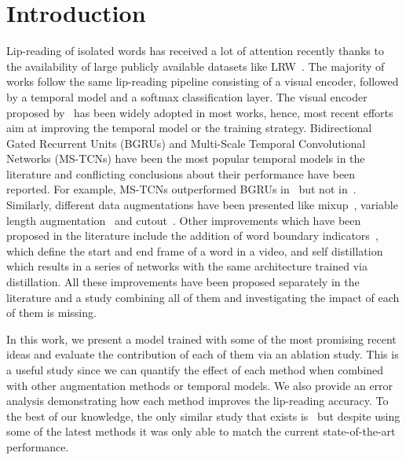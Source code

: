 \documentclass{article}
\begin{document}
\section{Introduction}
\label{sec:intro}
\vspace{-0.2cm}
Lip-reading of isolated words has received a lot of attention recently thanks to the availability of large publicly available datasets like LRW~\cite{chung16}. The majority of works follow the same lip-reading pipeline consisting of a visual encoder, followed by a temporal model and a softmax classification layer. The visual encoder proposed by~\cite{stafylakis2017combining} has been widely adopted in most works,  hence, most recent efforts aim at improving the temporal model or the training strategy. Bidirectional Gated Recurrent Units (BGRUs) and Multi-Scale Temporal Convolutional Networks (MS-TCNs) have been the most popular temporal models in the literature and conflicting conclusions about their performance have been reported. For example, MS-TCNs outperformed BGRUs in~\cite{martinez2020lipreading} but not in~\cite{DBLP:journals/corr/abs-2011-07557}. Similarly, different data augmentations have been presented like mixup~\cite{DBLP:journals/corr/abs-2011-07557, ma2020towards}, variable length augmentation~\cite{martinez2020lipreading} and cutout~\cite{zhang2020can}. Other improvements which have been proposed in the literature include the addition of word boundary indicators~\cite{stafylakis18}, which  define the start and end frame of a word in a video, and self distillation~\cite{ma2020towards} which results in a series of networks with the same architecture trained via distillation. All these improvements have been proposed separately in the literature and a study combining all of them and investigating the impact of each of them is missing.

In this work, we present a model trained with some of the most promising recent ideas and evaluate the contribution of each of them via an ablation study. This is a useful study since we can quantify the effect of each method when combined with other augmentation methods or temporal models. We also provide an error analysis demonstrating how each method improves the lip-reading accuracy. To the best of our knowledge, the only similar study that exists is~\cite{DBLP:journals/corr/abs-2011-07557} but despite using some of the latest methods it was only able to match the current state-of-the-art performance.     
\end{document}
